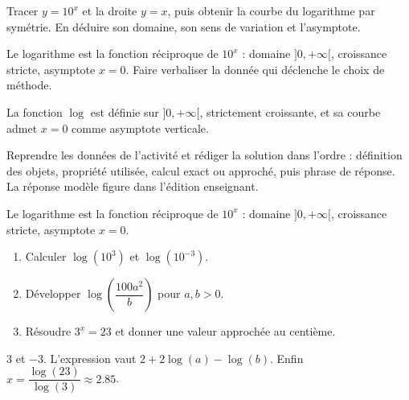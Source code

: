\begin{activity}
Tracer $y=10^x$ et la droite $y=x$, puis obtenir la courbe du logarithme par symétrie. En déduire son domaine, son sens de variation et l'asymptote.
\begin{center}\end{center}
\end{activity}
\begin{solution}Le logarithme est la fonction réciproque de $10^x$ : domaine $]0,+\infty[$, croissance stricte, asymptote $x=0$. Faire verbaliser la donnée qui déclenche le choix de méthode.\end{solution}

\begin{summary}La fonction $\log$ est définie sur $]0,+\infty[$, strictement croissante, et sa courbe admet $x=0$ comme asymptote verticale.\end{summary}

\begin{example}
Reprendre les données de l'activité et rédiger la solution dans l'ordre : définition des objets, propriété utilisée, calcul exact ou approché, puis phrase de réponse. La réponse modèle figure dans l'édition enseignant.
\end{example}
\begin{solution}Le logarithme est la fonction réciproque de $10^x$ : domaine $]0,+\infty[$, croissance stricte, asymptote $x=0$.\end{solution}

\begin{exercise}[essentiel]
\begin{enumerate}\item Calculer $\log(10^3)$ et $\log(10^{-3})$.\item Développer $\log\!\left(\dfrac{100a^2}{b}\right)$ pour $a,b>0$.\item Résoudre $3^x=23$ et donner une valeur approchée au centième.\end{enumerate}
\end{exercise}
\begin{solution}$3$ et $-3$. L'expression vaut $2+2\log(a)-\log(b)$. Enfin $x=\dfrac{\log(23)}{\log(3)}\approx\num{2,85}$.\end{solution}


